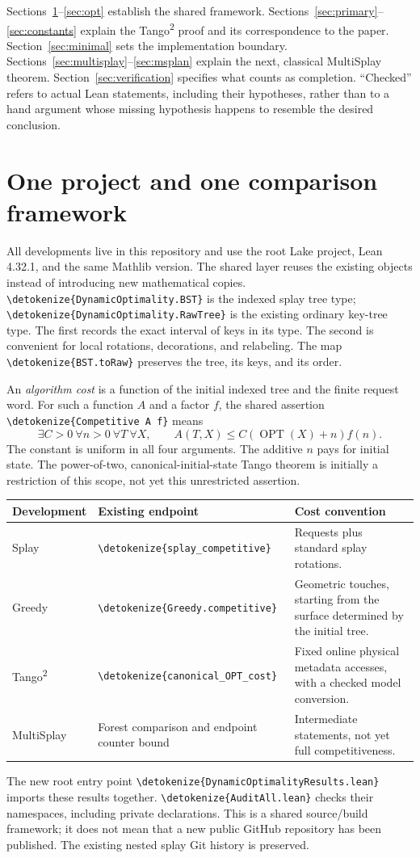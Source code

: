 \documentclass[11pt,a4paper]{article}
\newcommand{\OPT}{\operatorname{OPT}}
\newcommand{\lean}[1]{{\small\expandafter\nolinkurl\expandafter{\detokenize{#1}}}}
\newcommand{\nextpage}{\clearpage}
\begin{document}
Sections~\ref{sec:framework}--\ref{sec:opt} establish the shared framework.
Sections~\ref{sec:primary}--\ref{sec:constants} explain the Tango\textsuperscript{2}
proof and its correspondence to the paper. Section~\ref{sec:minimal}
sets the implementation boundary. Sections~\ref{sec:multisplay}--\ref{sec:msplan}
explain the next, classical MultiSplay theorem. Section~\ref{sec:verification}
specifies what counts as completion. ``Checked'' refers to actual Lean
statements, including their hypotheses, rather than to a hand argument
whose missing hypothesis happens to resemble the desired conclusion.

\nextpage
\section{One project and one comparison framework}\label{sec:framework}
All developments live in this repository and use
the root Lake project, Lean 4.32.1, and the same Mathlib version. The shared
layer reuses the existing objects instead of introducing new mathematical
copies. \lean{DynamicOptimality.BST} is the indexed splay tree type;
\lean{DynamicOptimality.RawTree} is the existing ordinary key-tree type.
The first records the exact interval of keys in its type. The second is
convenient for local rotations, decorations, and relabeling. The map
\lean{BST.toRaw} preserves the tree, its keys, and its order.

An \emph{algorithm cost} is a function of the initial indexed tree and
the finite request word. For such a function $A$ and a factor $f$, the
shared assertion \lean{Competitive A f} means
\[
 \exists C>0\ \forall n>0\ \forall T\ \forall X,
 \qquad A(T,X)\le C(\OPT(X)+n)f(n).
\]
The constant is uniform in all four arguments. The additive $n$ pays for
initial state. The power-of-two, canonical-initial-state Tango theorem is
initially a restriction of this scope, not yet this unrestricted assertion.

\begin{center}\small
\begin{tabular}{p{23mm}p{57mm}p{66mm}}
\toprule
Development & Existing endpoint & Cost convention \\
\midrule
Splay & \lean{splay_competitive} & Requests plus standard splay rotations. \\
Greedy & \lean{Greedy.competitive} & Geometric touches, starting from the surface determined by the initial tree. \\
Tango\textsuperscript{2} & \lean{canonical_OPT_cost} & Fixed online physical metadata accesses, with a checked model conversion. \\
MultiSplay & Forest comparison and endpoint counter bound & Intermediate statements, not yet full competitiveness. \\
\bottomrule
\end{tabular}
\end{center}
The new root entry point \lean{DynamicOptimalityResults.lean} imports
these results together. \lean{AuditAll.lean} checks their namespaces,
including private declarations. This is a shared source/build framework;
it does not mean that a new public GitHub repository has been published.
The existing nested splay Git history is preserved.
\end{document}
